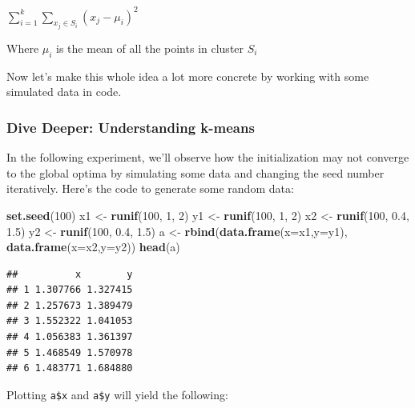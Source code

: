 \documentclass[]{article}
\newenvironment{Shaded}{\begin{snugshade}}{\end{snugshade}}
\newcommand{\DataTypeTok}[1]{\textcolor[rgb]{0.13,0.29,0.53}{#1}}
\newcommand{\DecValTok}[1]{\textcolor[rgb]{0.00,0.00,0.81}{#1}}
\newcommand{\FloatTok}[1]{\textcolor[rgb]{0.00,0.00,0.81}{#1}}
\newcommand{\KeywordTok}[1]{\textcolor[rgb]{0.13,0.29,0.53}{\textbf{#1}}}
\newcommand{\NormalTok}[1]{#1}
\newcommand{\OperatorTok}[1]{\textcolor[rgb]{0.81,0.36,0.00}{\textbf{#1}}}
\newcommand{\StringTok}[1]{\textcolor[rgb]{0.31,0.60,0.02}{#1}}
\begin{document}
\(\sum\limits^k_{i=1}\sum\limits_{x_j \in S_i} (x_j - \mu_i)^2\)

Where \(\mu_i\) is the mean of all the points in cluster \(S_i\)

Now let's make this whole idea a lot more concrete by working with some
simulated data in code.

\hypertarget{dive-deeper-understanding-k-means}{%
\subsubsection{Dive Deeper: Understanding
k-means}\label{dive-deeper-understanding-k-means}}

In the following experiment, we'll observe how the initialization may
not converge to the global optima by simulating some data and changing
the seed number iteratively. Here's the code to generate some random
data:

\begin{Shaded}
\begin{Highlighting}[]
\KeywordTok{set.seed}\NormalTok{(}\DecValTok{100}\NormalTok{)}
\NormalTok{x1 <-}\StringTok{ }\KeywordTok{runif}\NormalTok{(}\DecValTok{100}\NormalTok{, }\DecValTok{1}\NormalTok{, }\DecValTok{2}\NormalTok{)}
\NormalTok{y1 <-}\StringTok{ }\KeywordTok{runif}\NormalTok{(}\DecValTok{100}\NormalTok{, }\DecValTok{1}\NormalTok{, }\DecValTok{2}\NormalTok{)}
\NormalTok{x2 <-}\StringTok{ }\KeywordTok{runif}\NormalTok{(}\DecValTok{100}\NormalTok{, }\FloatTok{0.4}\NormalTok{, }\FloatTok{1.5}\NormalTok{)}
\NormalTok{y2 <-}\StringTok{ }\KeywordTok{runif}\NormalTok{(}\DecValTok{100}\NormalTok{, }\FloatTok{0.4}\NormalTok{, }\FloatTok{1.5}\NormalTok{)}
\NormalTok{a <-}\StringTok{ }\KeywordTok{rbind}\NormalTok{(}\KeywordTok{data.frame}\NormalTok{(}\DataTypeTok{x=}\NormalTok{x1,}\DataTypeTok{y=}\NormalTok{y1), }\KeywordTok{data.frame}\NormalTok{(}\DataTypeTok{x=}\NormalTok{x2,}\DataTypeTok{y=}\NormalTok{y2))}
\KeywordTok{head}\NormalTok{(a)}
\end{Highlighting}
\end{Shaded}

\begin{verbatim}
##          x        y
## 1 1.307766 1.327415
## 2 1.257673 1.389479
## 3 1.552322 1.041053
## 4 1.056383 1.361397
## 5 1.468549 1.570978
## 6 1.483771 1.684880
\end{verbatim}

Plotting \texttt{a\$x} and \texttt{a\$y} will yield the following:

\begin{Shaded}
\end{Shaded}
\end{document}
